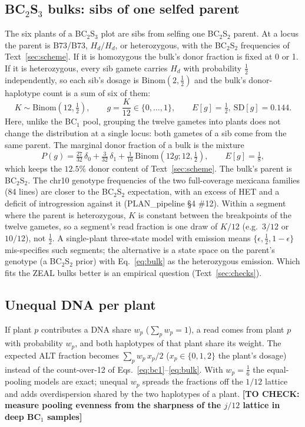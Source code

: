 \documentclass[11pt]{article}
\newcommand{\Bin}{\mathrm{Binom}}
\newcommand{\Hd}{H_d}
\newcommand{\todo}[1]{\textbf{[TO CHECK: #1]}}
\begin{document}
\subsection{BC$_2$S$_3$ bulks: sibs of one selfed parent}
\label{sec:bulk}
The six plants of a BC$_2$S$_3$ plot are sibs from selfing one BC$_2$S$_2$ parent. At a locus the parent is B73/B73, $\Hd/\Hd$, or
heterozygous, with the BC$_2$S$_2$ frequencies of Text~\ref{sec:scheme}. If it is homozygous the bulk's donor fraction is fixed at 0 or 1. If it
is heterozygous, every sib gamete carries $\Hd$ with probability $\tfrac12$ independently, so each sib's dosage is $\Bin(2,\tfrac12)$ and the
bulk's donor-haplotype count is a sum of six of them:
\begin{equation}
K\sim\Bin(12,\tfrac12),\qquad g=\frac{K}{12}\in\{0,\dots,1\},\qquad E[g]=\tfrac12,\ \mathrm{SD}[g]=0.144 .
\label{eq:bulk}
\end{equation}
Here, unlike the BC$_1$ pool, grouping the twelve gametes into plants does not change the distribution at a single locus: both gametes of a
sib come from the same parent. The marginal donor fraction of a bulk is the mixture
\begin{equation}
P(g)=\tfrac{27}{32}\,\delta_0+\tfrac{3}{32}\,\delta_1+\tfrac{1}{16}\,\Bin\!\left(12g;12,\tfrac12\right),\qquad E[g]=\tfrac18 ,
\label{eq:bulkmix}
\end{equation}
which keeps the $12.5\%$ donor content of Text~\ref{sec:scheme}. The bulk's parent is BC$_2$S$_2$. The chr10 genotype frequencies of the two full-coverage mexicana families (84 lines) are closer to the BC$_2$S$_2$ expectation, with an excess of HET and a deficit of introgression against it (PLAN\_pipeline \S4 \#12). Within a segment where the parent is heterozygous, $K$ is constant between
the breakpoints of the twelve gametes, so a segment's read fraction is one draw of $K/12$ (e.g.\ $3/12$ or $10/12$), not $\tfrac12$. A
single-plant three-state model with emission means $\{\epsilon,\tfrac12,1-\epsilon\}$ mis-specifies such segments; the alternative is a
state space on the parent's genotype (a BC$_2$S$_2$ prior) with Eq.~\eqref{eq:bulk} as the heterozygous emission. Which fits the ZEAL
bulks better is an empirical question (Text~\ref{sec:checks}).

\subsection{Unequal DNA per plant}
If plant $p$ contributes a DNA share $w_p$ ($\sum_p w_p=1$), a read comes from plant $p$ with probability $w_p$, and both haplotypes of that
plant share its weight. The expected ALT fraction becomes $\sum_p w_p\,x_p/2$ ($x_p\in\{0,1,2\}$ the plant's dosage) instead of the
count-over-12 of Eqs.~\eqref{eq:bc1}--\eqref{eq:bulk}. With $w_p=\tfrac16$ the equal-pooling models are exact; unequal $w_p$ spreads the
fractions off the $1/12$ lattice and adds overdispersion shared by the two haplotypes of a plant. \todo{measure pooling evenness from the
sharpness of the $j/12$ lattice in deep BC$_1$ samples}
\end{document}
